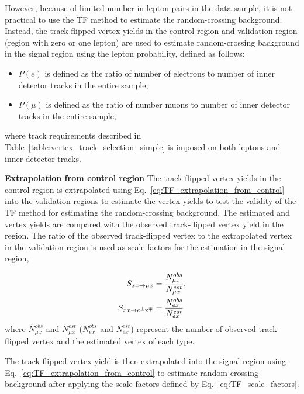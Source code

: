 However, because of limited number in lepton pairs in the data sample, it is not practical to use the TF method to estimate the random-crossing background. Instead, the track-flipped vertex yields in the control region and validation region (region with zero or one lepton) are used to estimate random-crossing background in the signal region using the lepton probability, defined as follows:
\begin{itemize}
\item $P(e)$ is defined as the ratio of number of electrons to number of inner detector tracks in the entire sample,
\item $P(\mu)$ is defined as the ratio of number muons to number of inner detector tracks in the entire sample,
\end{itemize}
where track requirements described in Table~\ref{table:vertex_track_selection_simple} is imposed on both leptons and inner detector tracks.

\textbf{Extrapolation from control region} The track-flipped vertex yields in the control region is extrapolated using Eq.~\ref{eq:TF_extrapolation_from_control} into the validation regions to estimate the vertex yields to test the validity of the TF method for estimating the random-crossing background. The estimated \mux and \ex vertex yields are compared with the observed track-flipped vertex yield in the region. The ratio of the observed track-flipped vertex to the extrapolated vertex in the validation region is used as scale factors for the estimation in the signal region,

\begin{align}
    S_{xx\rightarrow \mu x} &= \frac{N_{\mu x}^{obs}}{N_{\mu x}^{est}}, \nonumber \\
    S_{xx\rightarrow e^{\pm}\mathrm{x}^{\mp}}   &= \frac{N_{e x}^{obs}}{ N_{e x}^{est}}
\label{eq:random_crossing_scale_factor}
\end{align}
where $N_{\mu x}^{obs}$ and $N_{\mu x}^{est}$ ($N_{ex}^{obs}$ and $N_{ex}^{est}$) represent the number of observed track-flipped vertex and the estimated vertex of each type.

The track-flipped vertex yield is then extrapolated into the signal region using Eq.~\ref{eq:TF_extrapolation_from_control} to estimate random-crossing background after applying the scale factors defined by Eq.~\ref{eq:TF_scale_factors}.

